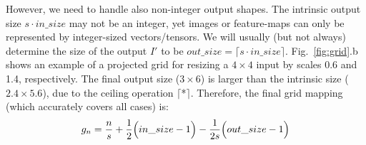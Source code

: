 However, we need to handle also non-integer output shapes. The intrinsic output size 
$s \cdot in\_size$ may not be an integer, yet images or feature-maps  can only be represented  by integer-sized vectors/tensors. We will usually (but not always) determine the size of the output $I'$ to be $out\_size =\lceil s \cdot in\_size \rceil$. Fig.~\ref{fig:grid}.b shows an example of a projected grid for resizing a $4 \times 4$ input  by scales 0.6 and 1.4,  respectively. The final output size ($3 \times 6$) is larger than the intrinsic size ($2.4 \times 5.6$), due to the ceiling operation $\lceil$*$\rceil$.  Therefore, the final  grid mapping (which accurately covers all cases) is:
\begin{align}
    \textcolor{black}{g_n} = \frac{n}{s} + \frac{1}{2}\Big( in\_size - 1\Big) - \frac{1}{2s}\Big(out\_size-1\Big)    
    \label{eq:grid}
\end{align}


